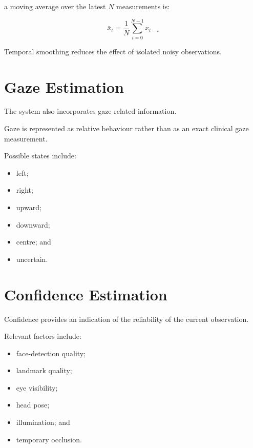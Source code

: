\documentclass{tietreport}
\begin{document}
a moving average over the latest $N$ measurements is:

\begin{equation}
\bar{x}_t
=
\frac{1}{N}
\sum_{i=0}^{N-1}
x_{t-i}
\label{eq:moving-average}
\end{equation}

Temporal smoothing reduces the effect of isolated noisy observations.


\section{Gaze Estimation}

The system also incorporates gaze-related information.

Gaze is represented as relative behaviour rather than as an exact
clinical gaze measurement.

Possible states include:

\begin{itemize}
    \item left;
    \item right;
    \item upward;
    \item downward;
    \item centre; and
    \item uncertain.
\end{itemize}


\section{Confidence Estimation}

Confidence provides an indication of the reliability of the current
observation.

Relevant factors include:

\begin{itemize}
    \item face-detection quality;
    \item landmark quality;
    \item eye visibility;
    \item head pose;
    \item illumination; and
    \item temporary occlusion.
\end{itemize}
\end{document}
